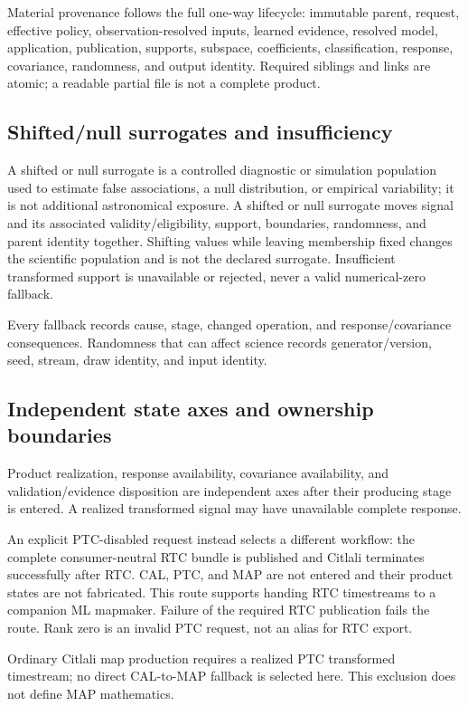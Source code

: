 \documentclass[11pt]{article}
\begin{document}
Material provenance follows the full one-way lifecycle: immutable parent,
request, effective policy, observation-resolved inputs, learned evidence,
resolved model, application, publication, supports, subspace, coefficients,
classification, response, covariance, randomness, and output identity.
Required siblings and links are atomic; a readable partial file is not a
complete product.

\subsection{Shifted/null surrogates and insufficiency}

A shifted or null surrogate is a controlled diagnostic or simulation
population used to estimate false associations, a null distribution, or
empirical variability; it is not additional astronomical exposure.
A shifted or null surrogate moves signal and its associated
validity/eligibility, support, boundaries, randomness, and parent identity
together. Shifting values while leaving membership fixed changes the
scientific population and is not the declared surrogate. Insufficient
transformed support is unavailable or rejected, never a valid numerical-zero
fallback.

Every fallback records cause, stage, changed operation, and response/covariance
consequences. Randomness that can affect science records generator/version,
seed, stream, draw identity, and input identity.

\subsection{Independent state axes and ownership boundaries}

Product realization, response availability, covariance availability, and
validation/evidence disposition are independent axes after their producing
stage is entered. A realized transformed signal may have unavailable complete
response.

An explicit PTC-disabled request instead selects a different workflow: the
complete consumer-neutral RTC bundle is published and Citlali terminates
successfully after RTC. CAL, PTC, and MAP are not entered and their product
states are not fabricated. This route supports handing RTC timestreams to a
companion ML mapmaker. Failure of the required RTC publication fails the
route. Rank zero is an invalid PTC request, not an alias for RTC export.

Ordinary Citlali map production requires a realized PTC transformed
timestream; no direct CAL-to-MAP fallback is selected here. This exclusion
does not define MAP mathematics.
\end{document}
